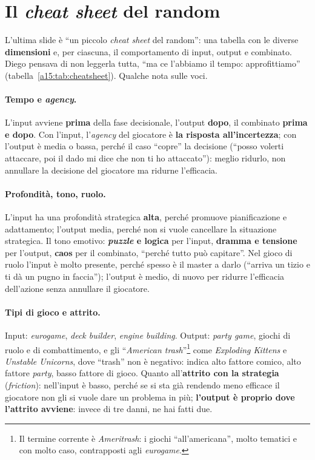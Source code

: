 \section{Il \emph{cheat sheet} del random}
\label{a15:sec:cheatsheet}

L'ultima slide è ``un piccolo \emph{cheat sheet} del random'': una tabella con le diverse
\textbf{dimensioni} e, per ciascuna, il comportamento di input, output e combinato. Diego
pensava di non leggerla tutta, ``ma ce l'abbiamo il tempo: approfittiamo''
(tabella~\ref{a15:tab:cheatsheet}). Qualche nota sulle voci.

\paragraph{Tempo e \emph{agency}.} L'input avviene \textbf{prima} della fase decisionale,
l'output \textbf{dopo}, il combinato \textbf{prima e dopo}. Con l'input, l'\emph{agency} del
giocatore è \textbf{la risposta all'incertezza}; con l'output è media o bassa, perché il caso
``copre'' la decisione (``posso volerti attaccare, poi il dado mi dice che non ti ho
attaccato''): meglio ridurlo, non annullare la decisione del giocatore ma ridurne l'efficacia.

\paragraph{Profondità, tono, ruolo.} L'input ha una profondità strategica \textbf{alta},
perché promuove pianificazione e adattamento; l'output media, perché non si vuole cancellare la
situazione strategica. Il tono emotivo: \textbf{\emph{puzzle} e logica} per l'input,
\textbf{dramma e tensione} per l'output, \textbf{caos} per il combinato, ``perché tutto può
capitare''. Nel gioco di ruolo l'input è molto presente, perché spesso è il master a darlo
(``arriva un tizio e ti dà un pugno in faccia''); l'output è medio, di nuovo per ridurre
l'efficacia dell'azione senza annullare il giocatore.

\paragraph{Tipi di gioco e attrito.} Input: \emph{eurogame}, \emph{deck builder},
\emph{engine building}. Output: \emph{party game}, giochi di ruolo e di combattimento, e gli
``\emph{American trash}''\footnote{Il termine corrente è \emph{Ameritrash}: i giochi
``all'americana'', molto tematici e con molto caso, contrapposti agli \emph{eurogame}.} come
\emph{Exploding Kittens} e \emph{Unstable Unicorns}, dove ``trash'' non è negativo: indica alto
fattore comico, alto fattore \emph{party}, basso fattore di gioco. Quanto all'\textbf{attrito
con la strategia} (\emph{friction}): nell'input è basso, perché se si sta già rendendo meno
efficace il giocatore non gli si vuole dare un problema in più; \textbf{l'output è proprio dove
l'attrito avviene}: invece di tre danni, ne hai fatti due.

